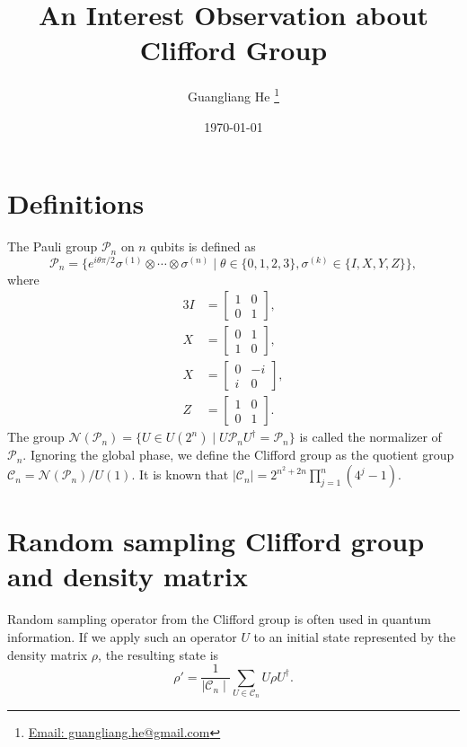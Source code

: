 \documentclass{article}
\title{An Interest Observation about Clifford Group}
\author{Guangliang He
  \thanks{\href{mailto:guangliang.he@gmail.com}
    {Email: guangliang.he@gmail.com}}}
\date{\today}
\begin{document}
\maketitle

\section{Definitions}
The Pauli group $\mathcal P_n$ on $n$ qubits is defined as
\begin{equation}
  \mathcal P_n = \{e^{i\theta\pi/2}\sigma^{(1)}\otimes\cdots\otimes\sigma^{(n)}
  \mid \theta\in\{0,1,2,3\}, \sigma^{(k)} \in \{I, X, Y, Z\}\},
\end{equation}
where
\begin{alignat}{3}
  I &= \begin{bmatrix} 1 & 0 \\ 0 & 1\end{bmatrix}, \\
  X &= \begin{bmatrix} 0 & 1 \\ 1 & 0\end{bmatrix}, \\
  X &= \begin{bmatrix} 0 & -i \\ i & 0\end{bmatrix}, \\
  Z &= \begin{bmatrix} 1 & 0 \\ 0 & 1\end{bmatrix}.
\end{alignat}
The group 
$\mathcal N(\mathcal P_n) = \{U\in U(2^n)\mid U\mathcal P_nU^\dagger
= \mathcal P_n\}$ is called the normalizer of $\mathcal P_n$.
Ignoring the global phase, we define the Clifford group as the quotient
group $\mathcal C_n = \mathcal N(\mathcal P_n)/U(1)$.
It is known that\cite{Koenig_2014}
$\mid\mathcal C_n\mid = 2^{n^2+2n}\prod_{j=1}^n(4^j-1)$.

\section{Random sampling Clifford group and density matrix}
Random sampling operator from the Clifford group is often used in quantum
information.  If we apply such an operator $U$ to an initial state
represented by the density matrix $\rho$, the resulting state is
\begin{equation}
  \label{eq:rho_prime}
  \rho' = \frac{1}{\mid\mathcal C_n\mid}\sum_{U\in\mathcal C_n}U\rho U^\dagger.
\end{equation}
\end{document}
